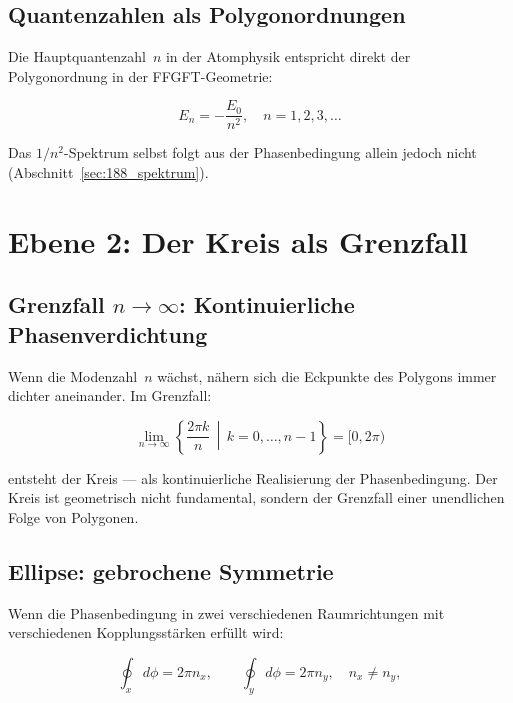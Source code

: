 \subsection{Quantenzahlen als Polygonordnungen}

Die Hauptquantenzahl~$n$ in der Atomphysik entspricht direkt der
Polygonordnung in der FFGFT-Geometrie:

\begin{equation}
  E_n = -\frac{E_0}{n^2}, \quad n = 1, 2, 3, \ldots
\end{equation}

Das $1/n^2$-Spektrum selbst folgt aus der Phasenbedingung allein
jedoch nicht (Abschnitt~\ref{sec:188_spektrum}).

\section{Ebene 2: Der Kreis als Grenzfall}

\subsection{Grenzfall \texorpdfstring{$n \to \infty$}{n gegen unendlich}: Kontinuierliche Phasenverdichtung}

Wenn die Modenzahl~$n$ wächst, nähern sich die Eckpunkte des Polygons
immer dichter aneinander. Im Grenzfall:

\begin{equation}
  \lim_{n \to \infty} \left\{ \frac{2\pi k}{n} \,\middle|\,
  k = 0,\ldots,n-1 \right\} = [0, 2\pi)
\end{equation}

entsteht der Kreis — als kontinuierliche Realisierung der Phasenbedingung.
Der Kreis ist geometrisch nicht fundamental, sondern der Grenzfall einer
unendlichen Folge von Polygonen.

\subsection{Ellipse: gebrochene Symmetrie}

Wenn die Phasenbedingung in zwei verschiedenen Raumrichtungen mit
verschiedenen Kopplungsstärken erfüllt wird:

\begin{equation}
  \oint_x d\phi = 2\pi n_x, \qquad
  \oint_y d\phi = 2\pi n_y, \quad n_x \neq n_y,
\end{equation}

